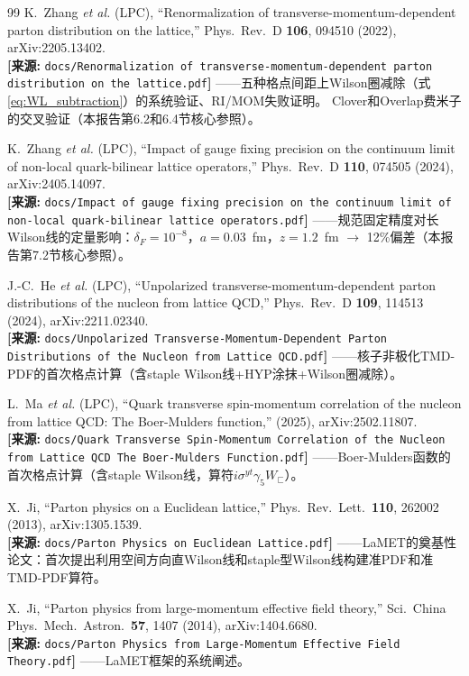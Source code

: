 \documentclass[12pt,a4paper]{ctexart}
\theoremstyle{definition}
\begin{document}
\begin{thebibliography}{99}
K.~Zhang \textit{et al.} (LPC),
``Renormalization of transverse-momentum-dependent parton distribution on the lattice,''
Phys.\ Rev.\ D \textbf{106}, 094510 (2022), arXiv:2205.13402.
\\\textbf{[来源:} \texttt{docs/Renormalization of transverse-momentum-dependent parton distribution on the lattice.pdf}\textbf{]}
——五种格点间距上Wilson圈减除（式\ref{eq:WL_subtraction}）的系统验证、RI/MOM失败证明。
Clover和Overlap费米子的交叉验证（本报告第6.2和6.4节核心参照）。

K.~Zhang \textit{et al.} (LPC),
``Impact of gauge fixing precision on the continuum limit of non-local quark-bilinear lattice operators,''
Phys.\ Rev.\ D \textbf{110}, 074505 (2024), arXiv:2405.14097.
\\\textbf{[来源:} \texttt{docs/Impact of gauge fixing precision on the continuum limit of non-local quark-bilinear lattice operators.pdf}\textbf{]}
——规范固定精度对长Wilson线的定量影响：$\delta_F=10^{-8}$，$a=0.03$~fm，$z=1.2$~fm $\to$ 12\%偏差（本报告第7.2节核心参照）。

J.-C.~He \textit{et al.} (LPC),
``Unpolarized transverse-momentum-dependent parton distributions of the nucleon from lattice QCD,''
Phys.\ Rev.\ D \textbf{109}, 114513 (2024), arXiv:2211.02340.
\\\textbf{[来源:} \texttt{docs/Unpolarized Transverse-Momentum-Dependent Parton Distributions of the Nucleon from Lattice QCD.pdf}\textbf{]}
——核子非极化TMD-PDF的首次格点计算（含staple Wilson线+HYP涂抹+Wilson圈减除）。

L.~Ma \textit{et al.} (LPC),
``Quark transverse spin-momentum correlation of the nucleon from lattice QCD: The Boer-Mulders function,''
(2025), arXiv:2502.11807.
\\\textbf{[来源:} \texttt{docs/Quark Transverse Spin-Momentum Correlation of the Nucleon from Lattice QCD The Boer-Mulders Function.pdf}\textbf{]}
——Boer-Mulders函数的首次格点计算（含staple Wilson线，算符$i\sigma^{yt}\gamma_5 W_{\sqsubset}$）。

X.~Ji,
``Parton physics on a Euclidean lattice,''
Phys.\ Rev.\ Lett.\ \textbf{110}, 262002 (2013), arXiv:1305.1539.
\\\textbf{[来源:} \texttt{docs/Parton Physics on Euclidean Lattice.pdf}\textbf{]}
——LaMET的奠基性论文：首次提出利用空间方向直Wilson线和staple型Wilson线构建准PDF和准TMD-PDF算符。

X.~Ji,
``Parton physics from large-momentum effective field theory,''
Sci.\ China Phys.\ Mech.\ Astron.\ \textbf{57}, 1407 (2014), arXiv:1404.6680.
\\\textbf{[来源:} \texttt{docs/Parton Physics from Large-Momentum Effective Field Theory.pdf}\textbf{]}
——LaMET框架的系统阐述。


\end{thebibliography}
\end{document}
